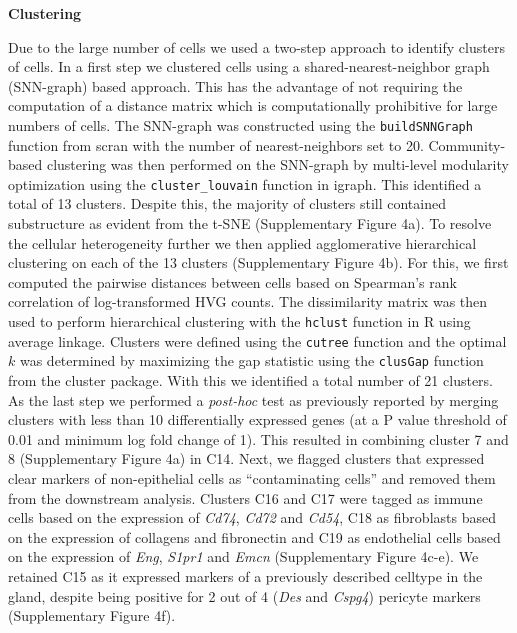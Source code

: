 \documentclass[titlepage, 12pt, oneside]{amsart}
\begin{document}
\textbf{Clustering}

Due to the large number of cells we used a two-step approach to identify clusters of cells.
In a first step we clustered cells using a shared-nearest-neighbor graph (SNN-graph) based approach.
This has the advantage of not requiring the computation of a distance matrix which is computationally prohibitive for large numbers of cells.
The SNN-graph was constructed using the \texttt{buildSNNGraph} function from scran with the number of nearest-neighbors set to 20\autocite{Lun2016a}.
Community-based clustering was then performed on the SNN-graph by multi-level modularity optimization using the \texttt{cluster\_louvain} function in igraph\autocite{Csardi2006}.
This identified a total of 13 clusters.
Despite this, the majority of clusters still contained substructure as evident from the t-SNE (Supplementary Figure 4a).
To resolve the cellular heterogeneity further we then applied agglomerative hierarchical clustering on each of the 13 clusters (Supplementary Figure 4b).
For this, we first computed the pairwise distances between cells based on Spearman's rank correlation of log-transformed HVG counts.
The dissimilarity matrix was then used to perform hierarchical clustering with the \texttt{hclust} function in R using average linkage.
Clusters were defined using the \texttt{cutree} function and the optimal $k$ was determined by maximizing the gap statistic using the \texttt{clusGap} function from the cluster package\autocite{Maechler2017}.
With this we identified a total number of 21 clusters.
As the last step we performed a \textit{post-hoc} test as previously reported\autocite{Macosko2015} by merging clusters with less than 10 differentially expressed genes (at a P value threshold of 0.01 and minimum log fold change of 1).
This resulted in combining cluster 7 and 8 (Supplementary Figure 4a) in C14.
Next, we flagged clusters that expressed clear markers of non-epithelial cells as ``contaminating cells'' and removed them from the downstream analysis.
Clusters C16 and C17 were tagged as immune cells based on the expression of \textit{Cd74}, \textit{Cd72} and \textit{Cd54}\autocite{Scheele2017}, C18 as fibroblasts based on the expression of collagens and fibronectin and C19 as endothelial cells based on the expression of \textit{Eng}, \textit{S1pr1} and \textit{Emcn} (Supplementary Figure 4c-e).
We retained C15 as it expressed markers of a previously described celltype in the gland\autocite{Wang2015}, despite being positive for 2 out of 4 (\textit{Des} and \textit{Cspg4}) pericyte markers\autocite{Armulik2011} (Supplementary Figure 4f).
\end{document}

